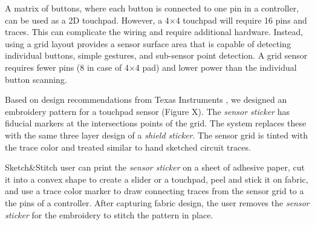 \documentclass[header.tex]{subfiles}
\begin{document}

A matrix of buttons, where each button is connected to one pin in a controller, can be used as a 2D touchpad. 
However, a 4$\times$4 touchpad will require 16 pins and traces. This can complicate the wiring and require additional hardware. Instead, using a grid layout provides a sensor surface area that is capable of detecting individual buttons, simple gestures, and sub-sensor point detection. A grid sensor requires fewer pins (8 in case of 4$\times$4 pad) and lower power than the individual button scanning. 

Based on design recommendations from Texas Instruments \cite{}, we designed an embroidery pattern for a touchpad sensor (Figure X). The \textit{sensor sticker} has fiducial markers at the intersections points of the grid. The system replaces these with the same three layer design of a \textit{shield sticker}. The sensor grid is tinted with the trace color and treated similar to hand sketched circuit traces.

Sketch\&Stitch user can print the \textit{sensor sticker} on a sheet of adhesive paper, cut it into a convex shape to create a slider or a touchpad, peel and stick it on fabric, and use a trace color marker to draw connecting traces from the sensor grid to a the pins of a controller. After capturing fabric design, the user removes the \textit{sensor sticker} for the embroidery to stitch the pattern in place.

\end{document}
